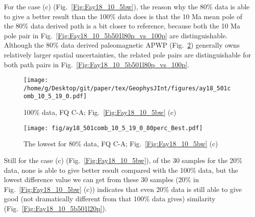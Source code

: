 For the case (c) (Fig.~\ref{Fig:Fay18_10_5bw}), the reason why the 80\% data is
able to give a better result than the 100\% data does is that the 10 Ma mean
pole of the 80\% data derived path is a bit closer to reference, because both
the 10 Ma pole pair in Fig.~\ref{Fig:Fay18_10_5b501l80p_vs_100p} are
distinguishable. Although the 80\% data derived paleomagnetic APWP
(Fig.~\ref{Fig:Fay18_10_5b501l80p}) generally owns relatively larger spatial
uncertainties, the related pole pairs are distinguishable for both path pairs in
Fig.~\ref{Fig:Fay18_10_5b501l80p_vs_100p}.

\begin{figure*}[tbp]
  \captionsetup[subfigure]{labelformat=empty,aboveskip=-6pt,belowskip=-6pt}
  \centering
  \begin{subfigure}[htbp]{.49\textwidth}
    \captionsetup{skip=0pt}
    \centering
    \texttt{[image: /home/g/Desktop/git/paper/tex/GeophysJInt/figures/ay18\_501comb\_10\_5\_19\_0.pdf]}
	\caption{100\% data, FQ C-A; Fig.~\ref{Fig:Fay18_10_5bw}
	(c)}\label{Fig:Fay18_10_5b501}
  \end{subfigure}
  \begin{subfigure}[htbp]{.49\textwidth}
    \captionsetup{skip=0pt}
    \centering
    \texttt{[image: fig/ay18\_501comb\_10\_5\_19\_0\_80perc\_Best.pdf]}  %
    \caption{The lowest for 80\% data, FQ C-A;
	Fig.~\ref{Fig:Fay18_10_5bw} (c)}\label{Fig:Fay18_10_5b501l80p}
  \end{subfigure}
  \caption[Less data, better similarity?]{Comparing the 100\% Indian
  120 Ma paleomagnetic data derived result with the best of the only
  80\% data (giving even better similarity) derived results (the green dot in
  Fig.~\ref{Fig:Fay18_10_5bw} (c)).}\label{Fig:Fay18_10_5b501l80p_vs_100p}
\end{figure*}

Still for the case (c) (Fig.~\ref{Fig:Fay18_10_5bw}), of the 30 samples for the
20\% data, none is able to give better result compared with the 100\% data, but
the lowest difference value we can get from these 30 samples (20\% in
Fig.~\ref{Fig:Fay18_10_5bw} (c)) indicates that even 20\% data is still able to
give good (not dramatically different from that 100\% data gives) similarity
(Fig.~\ref{Fig:Fay18_10_5b501l20p}).

